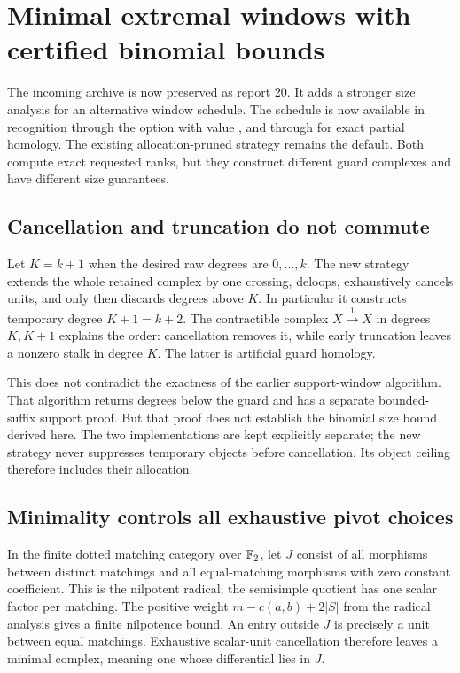 \section{Minimal extremal windows with certified binomial bounds}
\label{sec:minimal-window-integration}

The incoming archive 
is now preserved as report 20. It adds a stronger size analysis for an alternative window schedule. The
schedule is now available in recognition through the
 option with value , and through
 for exact partial homology.
The existing allocation-pruned strategy remains the default. Both compute
exact requested ranks, but they construct different guard complexes and
have different size guarantees.

\subsection{Cancellation and truncation do not commute}
Let $K=k+1$ when the desired raw degrees are $0,\ldots,k$.
The new strategy extends the whole retained complex by one crossing,
deloops, exhaustively cancels units, and only then discards degrees above
$K$. In particular it constructs temporary degree $K+1=k+2$.
The contractible complex $X\xrightarrow{1}X$ in degrees $K,K+1$
explains the order: cancellation removes it, while early truncation leaves
a nonzero stalk in degree $K$. The latter is artificial guard homology.

This does not contradict the exactness of the earlier support-window
algorithm. That algorithm returns degrees below the guard and has a
separate bounded-suffix support proof. But that proof does not establish
the binomial size bound derived here. The two implementations are kept
explicitly separate; the new strategy never suppresses temporary objects
before cancellation. Its object ceiling therefore includes their allocation.

\subsection{Minimality controls all exhaustive pivot choices}
In the finite dotted matching category over $\mathbb{F}_2$, let $J$ consist of
all morphisms between distinct matchings and all equal-matching morphisms
with zero constant coefficient. This is the nilpotent radical; the
semisimple quotient has one scalar factor per matching. The positive
weight $m-c(a,b)+2|S|$ from the radical analysis gives a finite nilpotence
bound. An entry outside $J$ is precisely a unit between equal matchings.
Exhaustive scalar-unit cancellation therefore leaves a minimal complex,
meaning one whose differential lies in $J$.

